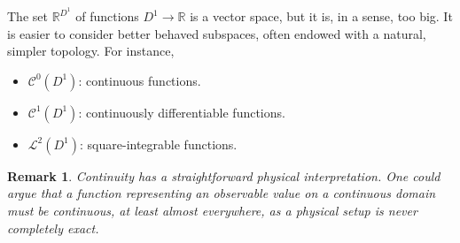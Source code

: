 \documentclass[final,sigplan,review,anonymous]{acmart}\settopmatter{printfolios=true,printccs=false,printacmref=false}
\theoremstyle{acmplain}
\theoremstyle{acmdefinition}
\newtheorem{remark}[theorem]{Remark}
\begin{document}
The set $\mathbb{R}^{D^1}$ of functions $D^1 \to \mathbb{R}$ is a vector space, but it is, in a sense, too big.
It is easier to consider better behaved subspaces, often endowed with a natural, simpler topology.
For instance,
\begin{itemize}
\item $\mathcal{C}^0(D^1)$: continuous functions.
 \item $\mathcal{C}^1(D^1)$: continuously differentiable functions. %
 \item $\mathcal{L}^2(D^1)$: square-integrable functions. %
\end{itemize}
\begin{remark}
  Continuity has a straightforward physical interpretation.
  One could argue that a function representing an observable value on a continuous domain \emph{must} be continuous, at least almost everywhere,
  as a physical setup is never completely exact.
\end{remark}
\end{document}
